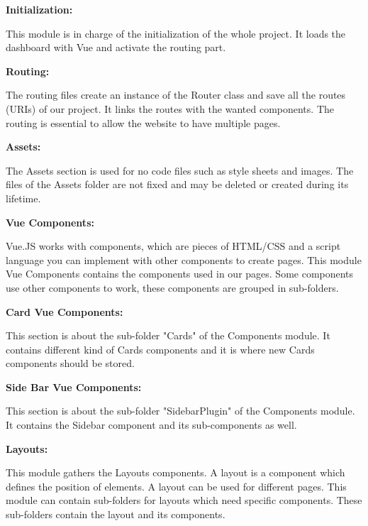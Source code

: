 \documentclass[conference]{IEEEtran}
\begin{document}
\vspace{0.5cm}

\textbf{Initialization:}

This module is in charge of the initialization of the whole project. It loads the dashboard with Vue and activate the routing part.

\vspace{0.5cm}

\textbf{Routing:}

The routing files create an instance of the Router class and save all the routes (URIs) of our project. It links the routes with the wanted components. The routing is essential to allow the website to have multiple pages.

\vspace{0.5cm}

\textbf{Assets:}

The Assets section is used for no code files such as style sheets and images. The files of the Assets folder are not fixed and may be deleted or created during its lifetime.

\vspace{0.5cm}

\textbf{Vue Components:}

Vue.JS works with components, which are pieces of HTML/CSS and a script language you can implement with other components to create pages. This module Vue Components contains the components used in our pages. Some components use other components to work, these components are grouped in sub-folders.

\vspace{0.5cm}

\textbf{Card Vue Components:}

This section is about the sub-folder "Cards" of the Components module. It contains different kind of Cards components and it is where new Cards components should be stored.

\vspace{0.5cm}

\textbf{Side Bar Vue Components:}

This section is about the sub-folder "SidebarPlugin" of the Components module. It contains the Sidebar component and its sub-components as well.

\vspace{0.5cm}

\textbf{Layouts:}

This module gathers the Layouts components. A layout is a component which defines the position of elements. A layout can be used for different pages. This module can contain sub-folders for layouts which need specific components. These sub-folders contain the layout and its components.
\end{document}
